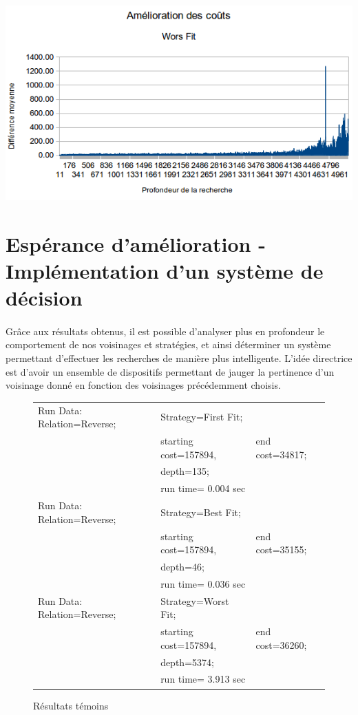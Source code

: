 \documentclass[a4paper,10pt]{report}
\begin{document}
\begin{center}
  \includegraphics[width=\textwidth]{images/att48-cost-worst-fit.png}
\end{center}


\pagebreak
\section{Espérance d'amélioration - Implémentation d'un système de décision}

\paragraph{}
  Grâce aux résultats obtenus, il est possible d'analyser plus en profondeur le
comportement de nos voisinages et stratégies, et ainsi déterminer un système
permettant d'effectuer les recherches de manière plus intelligente. L'idée
directrice est d'avoir un ensemble de dispositifs permettant de jauger la
pertinence d'un voisinage donné en fonction des voisinages précédemment choisis.


\begin{figure}[h]
  \begin{tabular}{lll}
    Run Data: Relation=Reverse;&
      Strategy=First Fit;\\
      &starting cost=157894,&
      end cost=34817;\\
      &depth=135;\\
      &run time= 0.004 sec\\
    Run Data: Relation=Reverse;&
      Strategy=Best Fit;\\
      &starting cost=157894,&
      end cost=35155;\\
      &depth=46;\\
      &run time= 0.036 sec\\
    Run Data: Relation=Reverse;&
      Strategy=Worst Fit;\\
      &starting cost=157894,&
      end cost=36260;\\
      &depth=5374;\\
      &run time= 3.913 sec\\
  \end{tabular}
  \caption{Résultats témoins}
\end{figure}
\end{document}
